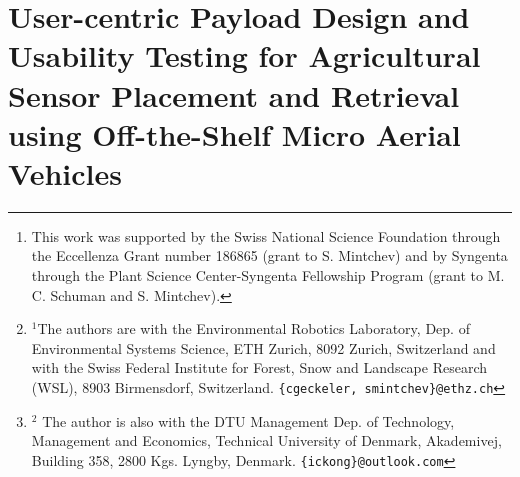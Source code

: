 \chapter[User-centric Payload Design for Sensor Placement]{User-centric Payload Design and Usability Testing for Agricultural Sensor Placement and Retrieval using Off-the-Shelf Micro Aerial Vehicles}
\label{ch:UR}

\newcommand{\figurevspacebelow}{\vspace{-1.5em}}	

\author{Christian~Geckeler$^{1}$, Iris~Kong$^{1,2}$, and Stefano~Mintchev$^{1}$%
\thanks{This work was supported by the Swiss National Science Foundation through the Eccellenza Grant number 186865 (grant to S. Mintchev) and by Syngenta through the Plant Science Center-Syngenta Fellowship Program (grant to M. C. Schuman and S. Mintchev).}%
\thanks{$^{1}$The authors are with the Environmental Robotics Laboratory, Dep. of Environmental Systems Science, ETH Zurich, 8092 Zurich, Switzerland and with the Swiss Federal Institute for Forest, Snow and Landscape Research (WSL), 8903 Birmensdorf, Switzerland. {\tt\footnotesize \{cgeckeler, smintchev\}@ethz.ch}}
\thanks{$^{2}$ The author is also with the DTU Management Dep. of Technology, Management and Economics, Technical University of Denmark, Akademivej, Building 358, 2800 Kgs. Lyngby, Denmark. {\tt\footnotesize \{ickong\}@outlook.com} }%
}



